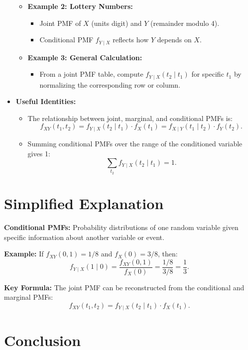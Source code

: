 \documentclass{article}
\begin{document}
\begin{itemize}
\begin{itemize}
      \item \textbf{Example 2: Lottery Numbers:}
        \begin{itemize}
          \item Joint PMF of $X$ (units digit) and $Y$ (remainder modulo 4).
          \item Conditional PMF $f_{Y \mid X}$ reflects how $Y$ depends on $X$.
        \end{itemize}

      \item \textbf{Example 3: General Calculation:}
        \begin{itemize}
          \item From a joint PMF table, compute $f_{Y \mid X}(t_2 \mid t_1)$ for specific $t_1$ by normalizing the corresponding row or column.
        \end{itemize}
    \end{itemize}

  \item \textbf{Useful Identities:}
    \begin{itemize}
      \item The relationship between joint, marginal, and conditional PMFs is:
        \[
          f_{XY}(t_1, t_2) = f_{Y \mid X}(t_2 \mid t_1) \cdot f_X(t_1) = f_{X \mid Y}(t_1 \mid t_2) \cdot f_Y(t_2).
        \]
      \item Summing conditional PMFs over the range of the conditioned variable gives 1:
        \[
          \sum_{t_2} f_{Y \mid X}(t_2 \mid t_1) = 1.
        \]
    \end{itemize}
\end{itemize}

\section*{Simplified Explanation}

\textbf{Conditional PMFs:}
Probability distributions of one random variable given specific information about another variable or event.

\textbf{Example:}
If $f_{XY}(0, 1) = 1/8$ and $f_X(0) = 3/8$, then:
\[
  f_{Y \mid X}(1 \mid 0) = \frac{f_{XY}(0, 1)}{f_X(0)} = \frac{1/8}{3/8} = \frac{1}{3}.
\]

\textbf{Key Formula:}
The joint PMF can be reconstructed from the conditional and marginal PMFs:
\[
  f_{XY}(t_1, t_2) = f_{Y \mid X}(t_2 \mid t_1) \cdot f_X(t_1).
\]

\section*{Conclusion}
\end{document}
